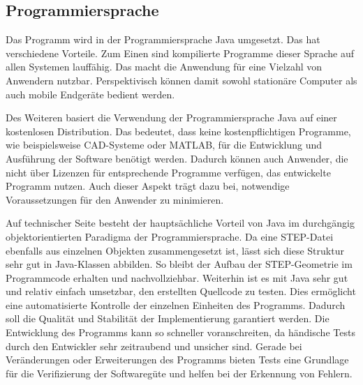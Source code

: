 \subsection{Programmiersprache} 
 
Das Programm wird in der Programmiersprache Java umgesetzt. Das hat verschiedene Vorteile. Zum Einen sind kompilierte Programme dieser Sprache auf allen Systemen lauffähig. Das macht die Anwendung für eine Vielzahl von Anwendern nutzbar. Perspektivisch können damit sowohl stationäre Computer als auch mobile Endgeräte bedient werden.

Des Weiteren basiert die Verwendung der Programmiersprache Java auf einer kostenlosen Distribution. Das bedeutet, dass keine kostenpflichtigen Programme, wie beispielsweise CAD-Systeme oder MATLAB, für die Entwicklung und Ausführung der Software benötigt werden. Dadurch können auch Anwender, die nicht über Lizenzen für entsprechende Programme verfügen, das entwickelte Programm nutzen. Auch dieser Aspekt trägt dazu bei, notwendige Voraussetzungen für den Anwender zu minimieren.

Auf technischer Seite besteht der hauptsächliche Vorteil von Java im durchgängig objektorientierten Paradigma der Programmiersprache. Da eine STEP-Datei ebenfalls aus einzelnen Objekten zusammengesetzt ist, lässt sich diese Struktur sehr gut in Java-Klassen abbilden. So bleibt der Aufbau der STEP-Geometrie im Programmcode erhalten und nachvollziehbar. 
Weiterhin ist es mit Java sehr gut und relativ einfach umsetzbar, den erstellten Quellcode zu testen. Dies ermöglicht eine automatisierte Kontrolle der einzelnen Einheiten des Programms. Dadurch soll die Qualität und Stabilität der Implementierung garantiert werden. Die Entwicklung des Programms kann so schneller voranschreiten, da händische Tests durch den Entwickler sehr zeitraubend und unsicher sind. Gerade bei Veränderungen oder Erweiterungen des Programms bieten Tests eine Grundlage für die Verifizierung der Softwaregüte und helfen bei der Erkennung von Fehlern.     




       
 